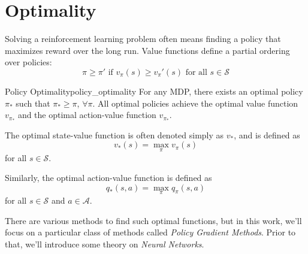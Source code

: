 \section{Optimality}
Solving a reinforcement learning problem often means finding a policy that maximizes reward over the long run. Value functions define a partial ordering over policies:
\[
\pi \geq \pi' \text{ if } v_\pi(s) \geq v_\pi'(s) \text{ for all } s \in \mathcal{S}      
\]
\begin{theorem}{Policy Optimality}{policy_optimality}
      For any MDP, there exists an optimal policy $\pi_*$ such that $\pi_* \geq \pi$, $\forall \pi$. All optimal policies achieve the optimal value function $v_{\pi_*}$ and the optimal action-value function $v_{\pi_*}$.  
\end{theorem}
The optimal state-value function is often denoted simply as $v_*$, and is defined as 
\[
v_*(s) = \max_\pi v_\pi(s)      
\]
for all $s \in \mathcal{S}$.

Similarly, the optimal action-value function is defined as
\[
      q_*(s, a) = \max_\pi q_\pi(s, a)      
\]
for all $s \in \mathcal{S}$ and $a \in \mathcal{A}$.

There are various methods to find such optimal functions, but in this work, we'll focus on a particular class of methods called \textit{Policy Gradient Methods}. Prior to that, we'll introduce some theory on \textit{Neural Networks}.